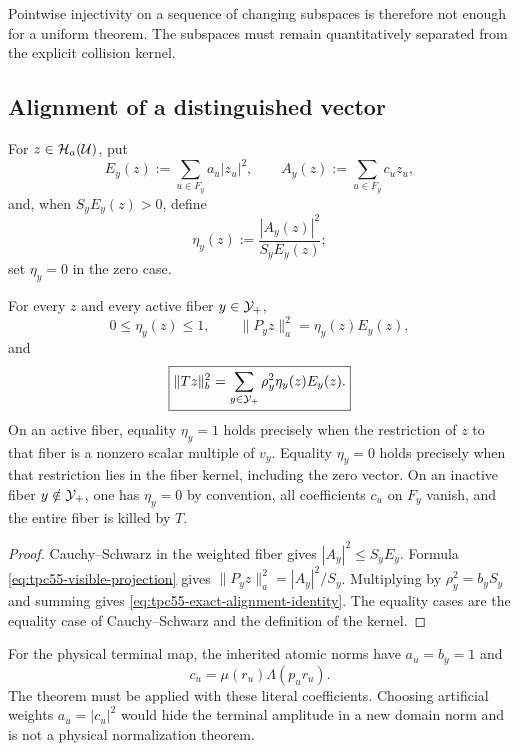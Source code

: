 Pointwise injectivity on a sequence of changing subspaces is therefore not
enough for a uniform theorem.  The subspaces must remain quantitatively
separated from the explicit collision kernel.

\subsection{Alignment of a distinguished vector}

For \(z\in\mathcal H_a(\mathcal U)\), put
\begin{equation}
 E_y(z):=\sum_{u\in F_y}a_u|z_u|^2,
 \qquad
 A_y(z):=\sum_{u\in F_y}c_uz_u,
 \label{eq:tpc55-fiber-energy-amplitude}
\end{equation}
and, when \(S_yE_y(z)>0\), define
\begin{equation}
 \eta_y(z):=\frac{|A_y(z)|^2}{S_yE_y(z)};
 \label{eq:tpc55-fiber-alignment}
\end{equation}
set \(\eta_y=0\) in the zero case.

\begin{theorem}
\label{thm:tpc55-visible-energy}
For every \(z\) and every active fiber \(y\in\mathcal Y_+\),
\begin{equation}
 0\le\eta_y(z)\le1,
 \qquad
 \|P_yz\|_a^2=\eta_y(z)E_y(z),
 \label{eq:tpc55-local-visible-energy}
\end{equation}
and
\begin{equation}
 \boxed{
 \|Tz\|_b^2
 =\sum_{y\in\mathcal Y_+}\rho_y^2\eta_y(z)E_y(z).}
 \label{eq:tpc55-exact-alignment-identity}
\end{equation}
On an active fiber, equality \(\eta_y=1\) holds precisely when the
restriction of \(z\) to that fiber is a nonzero scalar multiple of \(v_y\).
Equality \(\eta_y=0\) holds precisely when that restriction lies in the
fiber kernel, including the zero vector.  On an inactive fiber
\(y\notin\mathcal Y_+\), one has \(\eta_y=0\) by convention, all coefficients
\(c_u\) on \(F_y\) vanish, and the entire fiber is killed by \(T\).
\end{theorem}

\begin{proof}
Cauchy--Schwarz in the weighted fiber gives
\(|A_y|^2\le S_yE_y\).  Formula
\eqref{eq:tpc55-visible-projection} gives
\(\|P_yz\|_a^2=|A_y|^2/S_y\).  Multiplying by
\(\rho_y^2=b_yS_y\) and summing gives
\eqref{eq:tpc55-exact-alignment-identity}.  The equality cases are the
equality case of Cauchy--Schwarz and the definition of the kernel.
\end{proof}

For the physical terminal map, the inherited atomic norms have
\(a_u=b_y=1\) and
\begin{equation}
 c_u=\mu(r_u)\Lambda(p_ur_u).
 \label{eq:tpc55-physical-svd-coefficient}
\end{equation}
The theorem must be applied with these literal coefficients.  Choosing
artificial weights \(a_u=|c_u|^2\) would hide the terminal amplitude in a
new domain norm and is not a physical normalization theorem.
